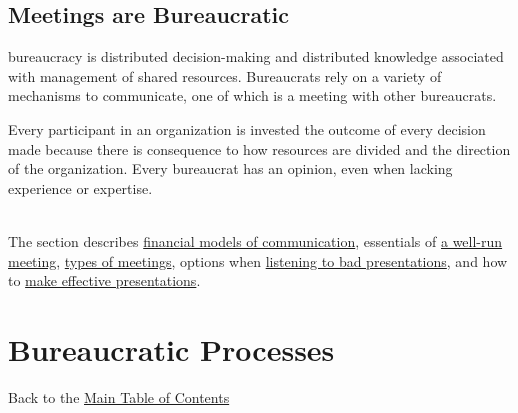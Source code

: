 \documentclass[openright]{book}
\begin{document}
    \section{Meetings are Bureaucratic\label{sec:meetings}}
    \Gls{bureaucracy} is distributed decision-making and distributed knowledge associated with management of shared resources. Bureaucrats rely on a variety of mechanisms to communicate, one of which is a meeting with other bureaucrats. 

    Every participant in an organization is invested the outcome of every decision made because there is consequence to how resources are divided and the direction of the organization. Every bureaucrat has an opinion, even when lacking experience or expertise. 

    \ \\

    The section describes \hyperref[sec:financial-models-of-communication]{financial models of communication}, essentials of \hyperref[sec:well-run-meeting]{a well-run meeting}, \hyperref[sec:characterizing-meetings]{types of meetings}, options when \hyperref[sec:bad-presentations]{listening to bad presentations}, and how to \hyperref[sec:effective-presentations]{make effective presentations}.

        
         
         
         
        
        

  \chapter{Bureaucratic Processes\label{sec:process}}
  {\footnotesize Back to the \hyperref[sec:toc]{Main Table of Contents}}
  \minitoc
     \clearpage
     \clearpage
     \clearpage
     \clearpage
     \clearpage
     \clearpage
     \clearpage
     \clearpage
     \clearpage
    \clearpage
     \clearpage
\end{document}
